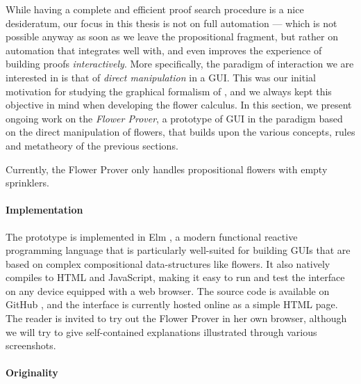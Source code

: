 While having a complete and efficient proof search procedure is a nice
desideratum, our focus in this thesis is not on full automation --- which is not
possible anyway as soon as we leave the propositional fragment, but rather on
automation that integrates well with, and even improves the experience of
building proofs \emph{interactively}. More specifically, the paradigm of
interaction we are interested in is that of \emph{direct manipulation} in a GUI.
This was our initial motivation for studying the graphical formalism of , and
we always kept this objective in mind when developing the flower calculus. In
this section, we present ongoing work on the \emph{Flower Prover}, a prototype
of GUI in the  paradigm based on the direct manipulation of
flowers, that builds upon the various concepts, rules and metatheory of the
previous sections.

\begin{remark}
Currently, the Flower Prover only handles propositional flowers with empty
sprinklers.
\end{remark}

\paragraph{Implementation}

The prototype is implemented in Elm , a modern
functional reactive programming language that is particularly well-suited for
building GUIs that are based on complex compositional data-structures like
flowers. It also natively compiles to HTML and JavaScript, making it easy to run
and test the interface on any device equipped with a web browser. The source
code is available on GitHub \cite{flower-prover}, and the interface is currently
hosted online as a simple HTML
page.
The reader is invited to try out the Flower Prover in her own browser, although
we will try to give self-contained explanations illustrated through various
screenshots.

\paragraph{Originality}

